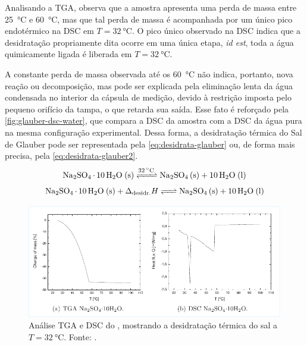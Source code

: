 Analisando a TGA, \textcite{Rens2012} observa que a amostra apresenta uma perda de massa entre \qty{25}{\celsius} e \qty{60}{\celsius}, mas que tal perda de massa é acompanhada por um único pico endotérmico na DSC em $T = \qty{32}{\celsius}$.  O pico único observado na DSC indica que a desidratação propriamente dita ocorre em uma única etapa, \emph{id est}, toda a água quimicamente ligada é liberada em $T = \qty{32}{\celsius}$.

A constante perda de massa observada até os \qty{60}{\celsius} não indica, portanto, nova reação ou decomposição, mas pode ser explicada pela eliminação lenta da água condensada no interior da cápsula de medição, devido à restrição imposta pelo pequeno orifício da tampa, o que retarda sua saída. Esse fato é reforçado pela \autoref{fig:glauber-dsc-water}, que compara a DSC da amostra com a DSC da água pura na mesma configuração experimental. Dessa forma, a desidratação térmica do Sal de Glauber pode ser representada pela \autoref{eq:desidrata-glauber} ou, de forma mais precisa, pela \autoref{eq:desidrata-glauber2}. \cite{Rens2012}%
\begin{equation}%
    \ce{Na2SO4 . 10 H2O (s) <=>[\qty{32}{\celsius}] Na2SO4 (s) + 10 H2O (l)} \label{eq:desidrata-glauber}
\end{equation}%
\begin{equation}%
    \ce{Na2SO4 . 10 H2O (s) + $\Delta_{\text{desidr.}} H$ <=> Na2SO4 (s) + 10 H2O (l)} \label{eq:desidrata-glauber2}
\end{equation}%

\begin{figure}
    \centering
    \includegraphics[width=\linewidth]{img/Glauber_TGA_DSC_Rens2012.pdf}
    \caption{Análise TGA e DSC do , mostrando a desidratação térmica do sal a $T = \qty{32}{\celsius}$. Fonte: \textcite{Rens2012}.}
    \label{fig:glauber-tga-dsc}
\end{figure}

